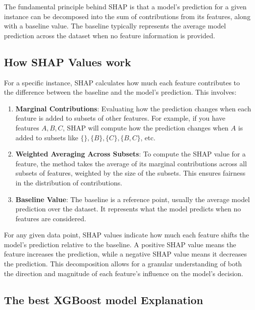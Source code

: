\documentclass{article}%
\begin{document}
        The fundamental principle behind SHAP is that a model’s prediction for a given instance can be decomposed into the sum of contributions from its features, along with a baseline value. The baseline typically represents the average model prediction across the dataset when no feature information is provided.

        \subsection*{How SHAP Values work}

        For a specific instance, SHAP calculates how much each feature contributes to the difference between the baseline and the model's prediction. This involves:

        \begin{enumerate}
            \item \textbf{Marginal Contributions}: Evaluating how the prediction changes when each feature is added to subsets of other features. For example, if you have features \( A, B, C \), SHAP will compute how the prediction changes when \( A \) is added to subsets like \( \{\}, \{ B \}, \{ C \}, \{ B, C \} \), etc.
            \item \textbf{Weighted Averaging Across Subsets}: To compute the SHAP value for a feature, the method takes the average of its marginal contributions across all subsets of features, weighted by the size of the subsets. This ensures fairness in the distribution of contributions.
            \item \textbf{Baseline Value}: The baseline is a reference point, usually the average model prediction over the dataset. It represents what the model predicts when no features are considered.
        \end{enumerate}

        For any given data point, SHAP values indicate how much each feature shifts the model’s prediction relative to the baseline. A positive SHAP value means the feature increases the prediction, while a negative SHAP value means it decreases the prediction. This decomposition allows for a granular understanding of both the direction and magnitude of each feature's influence on the model’s decision.

%
\newpage%
\subsection{The best XGBoost model Explanation}%
\label{subsec:ThebestXGBoostmodelExplanation}%
\end{document}

